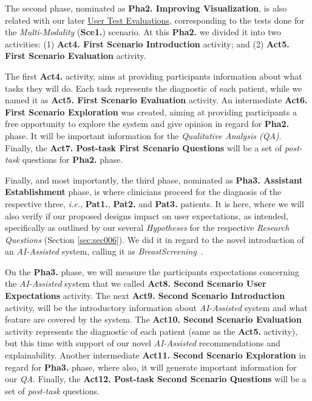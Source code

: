 \hfill

The second phase, nominated as \textbf{Pha2. Improving Visualization}, is also related with our later \href{https://github.com/MIMBCD-UI/prototype-breast-screening/wiki/User-Research#user-test-evaluations-}{User Test Evaluations}, corresponding to the tests done for the \textit{Multi-Modality} (\textbf{Sce1.}) scenario. At this \textbf{Pha2.} we divided it into two activities: (1) \textbf{Act4. First Scenario Introduction} activity; and (2) \textbf{Act5. First Scenario Evaluation} activity.

The first \textbf{Act4.} activity, aims at providing participants information about what tasks they will do. Each task represents the diagnostic of each patient, while we named it as \textbf{Act5. First Scenario Evaluation} activity. An intermediate \textbf{Act6. First Scenario Exploration} was created, aiming at providing participants a free opportunity to explore the system and give opinion in regard for {\bf Pha2.} phase. It will be important information for the {\it Qualitative Analysis (QA)}. Finally, the \textbf{Act7. Post-task First Scenario Questions} will be a set of \textit{post-task} questions for {\bf Pha2.} phase.

Finally, and most importantly, the third phase, nominated as \textbf{Pha3. Assistant Establishment} phase, is where clinicians proceed for the diagnosis of the respective three, \textit{i.e.}, \textbf{Pat1.}, \textbf{Pat2.} and \textbf{Pat3.} patients. It is here, where we will also verify if our proposed designs impact \cite{amershi2019guidelines, kocielnik2019will} on user expectations, as intended, specifically as outlined by our several \textit{Hypotheses} for the respective \textit{Research Questions} (Section \ref{sec:sec006}). We did it in regard to the novel introduction of an \textit{AI-Assisted} system, calling it as \textit{BreastScreening}~\cite{calistobreastscreening}.

On the {\bf Pha3.} phase, we will measure the participants expectations concerning the \textit{AI-Assisted} system that we called \textbf{Act8. Second Scenario User Expectations} activity. The next \textbf{Act9. Second Scenario Introduction} activity, will be the introductory information about \textit{AI-Assisted} system and what feature are covered by the system. The \textbf{Act10. Second Scenario Evaluation} activity represents the diagnostic of each patient (same as the \textbf{Act5.} activity), but this time with support of our novel \textit{AI-Assisted} recommendations and explainability. Another intermediate \textbf{Act11. Second Scenario Exploration} in regard for {\bf Pha3.} phase, where also, it will generate important information for our {\it QA}. Finally, the \textbf{Act12. Post-task Second Scenario Questions} will be a set of \textit{post-task} questions.

